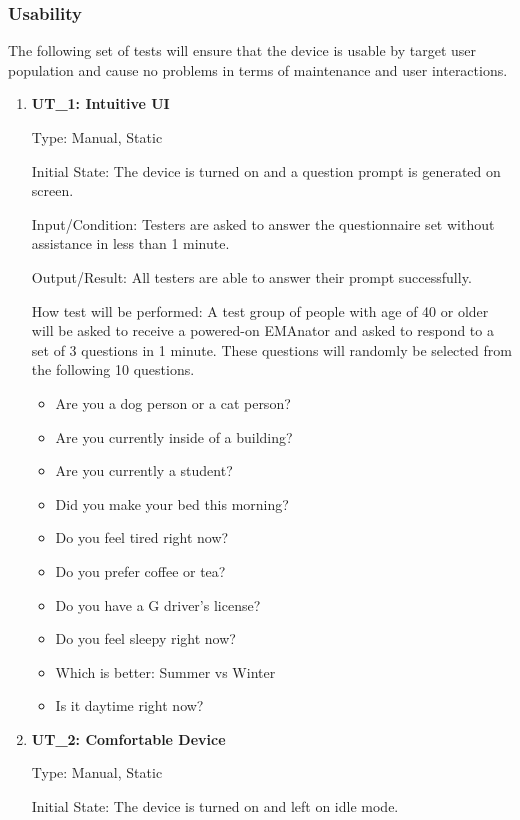 \documentclass[12pt, titlepage]{article}
\begin{document}
\subsubsection{Usability}
The following set of tests will ensure that the device is usable by target user population and cause no problems in terms of maintenance and user interactions.		
\begin{enumerate}

\item\textbf{{UT\_1: Intuitive UI\\}}\label{UT1}

Type: Manual, Static
					
Initial State: The device is turned on and a question prompt is generated on screen.
					
Input/Condition: Testers are asked to answer the questionnaire set without assistance in less than 1 minute.
					
Output/Result: All testers are able to answer their prompt successfully.
					
How test will be performed: A test group of people with age of 40 or older will be asked to receive a powered-on EMAnator and asked to respond to a set of 3 questions in 1 minute. These questions will randomly be selected from the following 10 questions.

\begin{itemize}
\item Are you a dog person or a cat person?
\item Are you currently inside of a building?
\item Are you currently a student?
\item Did you make your bed this morning?
\item Do you feel tired right now?
\item Do you prefer coffee or tea?
\item Do you have a G driver's license?
\item Do you feel sleepy right now?
\item Which is better: Summer vs Winter
\item Is it daytime right now?
\end{itemize}
					
\item\textbf{{UT\_2: Comfortable Device\\}}\label{UT2}

Type: Manual, Static
					
Initial State: The device is turned on and left on idle mode.
					

\end{enumerate}
\end{document}
